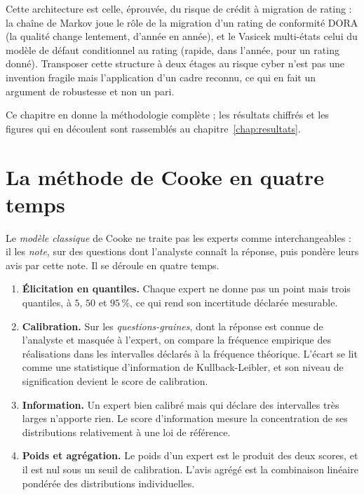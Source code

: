 \noindent Cette architecture est celle, éprouvée, du risque de crédit à migration de
rating : la chaîne de Markov joue le rôle de la migration d'un \og rating de conformité DORA\fg{}
(la qualité change lentement, d'année en année), et le Vasicek multi-états celui du modèle de
défaut conditionnel au rating (rapide, dans l'année, pour un rating donné). Transposer
cette structure à deux étages au risque cyber n'est pas une invention fragile mais l'application
d'un cadre reconnu, ce qui en fait un argument de robustesse et non un pari.

Ce chapitre en donne la méthodologie complète ; les résultats chiffrés et les figures qui en
découlent sont rassemblés au chapitre~\ref{chap:resultats}.



\section{La méthode de Cooke en quatre temps}
\label{ch:elicitation}


Le \emph{modèle classique} de Cooke ne traite pas les experts comme interchangeables : il les
\emph{note}, sur des questions dont l'analyste connaît la réponse, puis pondère leurs avis par
cette note. Il se déroule en quatre temps.

\begin{enumerate}[itemsep=3pt,topsep=3pt]
\item \textbf{Élicitation en quantiles.} Chaque expert ne donne pas un point mais trois
      quantiles, à $5$, $50$ et $95\,\%$, ce qui rend son incertitude déclarée mesurable.
\item \textbf{Calibration.} Sur les \emph{questions-graines}, dont la réponse est connue de
      l'analyste et masquée à l'expert, on compare la fréquence empirique des réalisations dans
      les intervalles déclarés à la fréquence théorique. L'écart se lit comme une statistique
      d'information de Kullback-Leibler, et son niveau de signification devient le
      score de calibration.
\item \textbf{Information.} Un expert bien calibré mais qui déclare des intervalles très larges
      n'apporte rien. Le score d'information mesure la concentration de ses
      distributions relativement à une loi de référence.
\item \textbf{Poids et agrégation.} Le poids d'un expert est le produit des deux scores, et il
      est nul sous un seuil de calibration. L'avis agrégé est la combinaison linéaire
      pondérée des distributions individuelles.
\end{enumerate}

